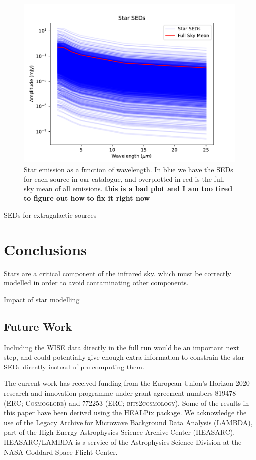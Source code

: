 \documentclass{aa}
\begin{document}
\begin{figure}
  \includegraphics[width=\columnwidth]{figs/starseds/star_seds.pdf}
  \caption{Star emission as a function of wavelength. In blue we have the SEDs for each source in our catalogue, and overplotted in red is the full sky mean of all emissions. \textbf{this is a bad plot and I am too tired to figure out how to fix it right now}}
  \label{fig:starSEDs}
\end{figure}

SEDs for extragalactic sources


\section{Conclusions}
\label{sec:conclusions}

Stars are a critical component of the infrared sky, which must be correctly modelled in order to avoid contaminating other components. 

Impact of star modelling

\subsection{Future Work}

Including the WISE data directly in the full run would be an important next step, and could potentially give enough extra information to constrain the star SEDs directly instead of pre-computing them. 




\begin{acknowledgements}
 The current work has received funding from the European
  Union’s Horizon 2020 research and innovation programme under grant
  agreement numbers 819478 (ERC; \textsc{Cosmoglobe}) and 772253 (ERC;
  \textsc{bits2cosmology}). Some of the results in this paper have been derived using the HEALPix \citep{HEALPIX} package.
  We acknowledge the use of the Legacy Archive for Microwave Background Data
  Analysis (LAMBDA), part of the High Energy Astrophysics Science Archive Center
  (HEASARC). HEASARC/LAMBDA is a service of the Astrophysics Science Division at
  the NASA Goddard Space Flight Center.  
\end{acknowledgements}


%



\end{document}
